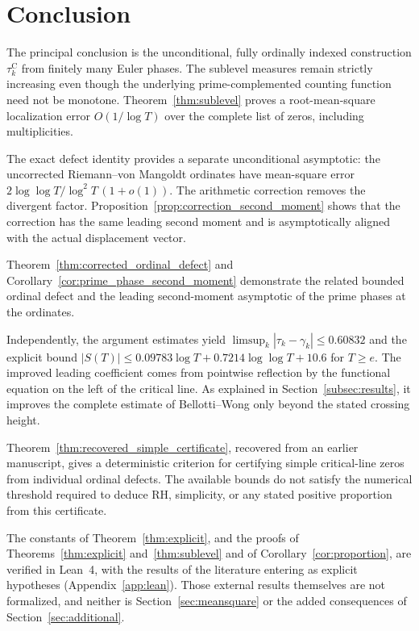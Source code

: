 \documentclass[11pt,a4paper]{article}
\makeatletter
\numberwithin{equation}{section}
\DeclareRobustCommand{\CGref}[1]{\ref{#1}}
\let\CG@origref\ref
\newcommand{\CG@gettip}[1]{\@ifundefined{CGTip@#1}{#1}{\csname CGTip@#1\endcsname}}
\DeclareRobustCommand{\CGref}[1]{\pdftooltip{\CG@origref{#1}}{\CG@gettip{#1}}}
\theoremstyle{definition}
\theoremstyle{remark}
\makeatother
\begin{document}
\section{Conclusion}\label{sec:conclusion}
The principal conclusion is the unconditional, fully ordinally indexed
construction $\tau_k^{\mathrm C}$ from finitely many Euler phases.
The sublevel measures remain strictly increasing even though the
underlying prime-complemented counting function need not be monotone.
Theorem~\CGref{thm:sublevel} proves a root-mean-square localization error
$O(1/\log T)$ over the complete list of zeros, including multiplicities.

The exact defect identity provides a separate unconditional asymptotic:
the uncorrected Riemann--von Mangoldt ordinates have mean-square error
$2\log\log T/\log^2T\,(1+o(1))$. The arithmetic correction removes the
divergent factor. Proposition~\CGref{prop:correction_second_moment} shows that
the correction has the same leading second moment and is asymptotically aligned with
the actual displacement vector.

Theorem~\CGref{thm:corrected_ordinal_defect}
and Corollary~\CGref{cor:prime_phase_second_moment} demonstrate the related
bounded ordinal defect and the leading second-moment asymptotic of the prime phases
at the ordinates.

Independently, the argument estimates yield
$\limsup_k|\tau_k-\gamma_k|\le0.60832$ and the explicit bound
$|S(T)|\le0.09783\log T+0.7214\log\log T+10.6$ for $T\ge e$.
The improved leading coefficient comes from pointwise reflection by the
functional equation on the left of the critical line. As explained in
Section~\CGref{subsec:results}, it improves the complete estimate of
Bellotti--Wong only beyond the stated crossing height.

Theorem~\CGref{thm:recovered_simple_certificate}, recovered from an
earlier manuscript, gives a deterministic criterion for certifying simple
critical-line zeros from individual ordinal defects. The available bounds
do not satisfy the numerical threshold required to deduce RH, simplicity,
or any stated positive proportion from this certificate.

The constants of Theorem~\CGref{thm:explicit}, and the proofs of
Theorems~\CGref{thm:explicit} and~\CGref{thm:sublevel} and of
Corollary~\CGref{cor:proportion}, are verified in Lean~4, with the results
of the literature entering as explicit hypotheses
(Appendix~\CGref{app:lean}). Those external results themselves are not
formalized, and neither is Section~\CGref{sec:meansquare} or the added
consequences of Section~\CGref{sec:additional}.
\end{document}
